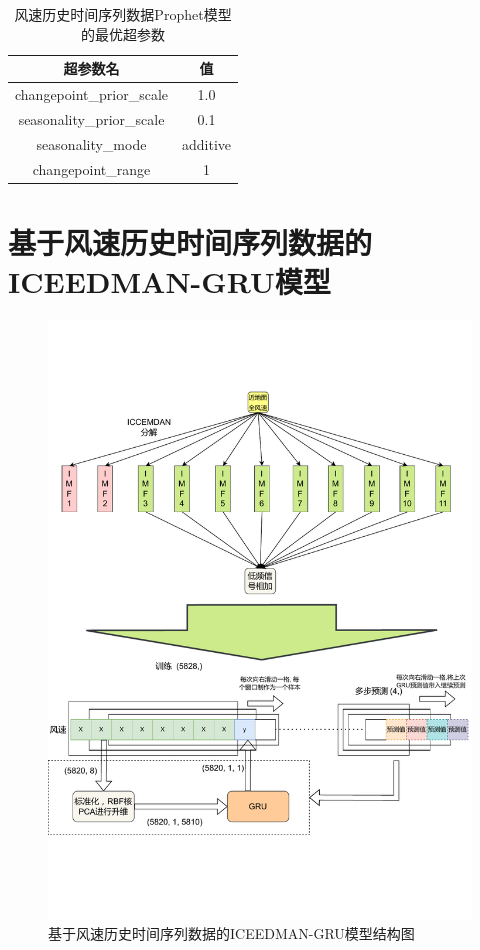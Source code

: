 \documentclass[AutoFakeBold]{LZUThesis}
\begin{document}
\begin{table}[H]
    \centering
    \caption{风速历史时间序列数据Prophet模型的最优超参数}
    \begin{tabular}{cc}
    \toprule
    超参数名 & 值 \\
    \midrule
    changepoint\_prior\_scale & 1.0 \\
    seasonality\_prior\_scale & 0.1 \\
    seasonality\_mode & additive \\
    changepoint\_range & 1 \\
    \bottomrule
    \end{tabular}
    \label{prophet_param}
\end{table}

\section{基于风速历史时间序列数据的ICEEDMAN-GRU模型}
\begin{figure}[H]
	\centering
    \includegraphics[width=1\textwidth]{figures/ICCEMDAN-GRU-Wind.pdf}
    \caption{基于风速历史时间序列数据的ICEEDMAN-GRU模型结构图}
    \label{fig_ICCEMDAN_GRU_Wind}
\end{figure}
\end{document}
